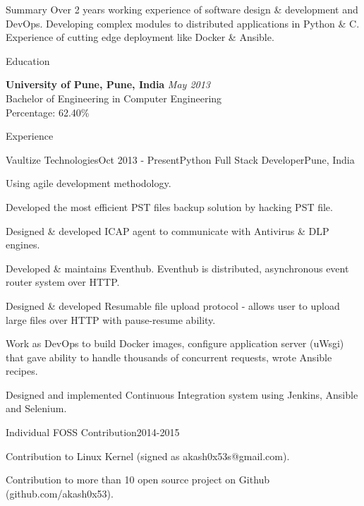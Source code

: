 \documentclass{resume} %
\begin{document}
\begin{rSection}{Summary}
Over 2 years working experience of software design \& development and DevOps. Developing complex modules to distributed applications in Python \& C. Experience of cutting edge deployment like Docker \& Ansible. 
\end{rSection}

\begin{rSection}{Education}

{\bf University of Pune, Pune, India} \hfill {\em May 2013} \\ 
Bachelor of Engineering in Computer Engineering \\
Percentage: 62.40\%

\end{rSection}


\begin{rSection}{Experience}

\begin{rSubsection}{Vaultize Technologies}{Oct 2013 - Present}{Python Full Stack Developer}{Pune, India}
\item Using agile development methodology.
\item Developed the most efficient PST files backup solution by hacking PST file.
\item Designed \& developed ICAP agent to communicate with Antivirus \& DLP engines.
\item Developed \& maintains Eventhub. Eventhub is distributed, asynchronous event router system over HTTP.
\item Designed \& developed Resumable file upload protocol - allows user to upload large files over HTTP with pause-resume ability.
\item Work as DevOps to build Docker images, configure application server (uWsgi) that gave ability to handle thousands of concurrent requests, wrote Ansible recipes.
\item Designed and implemented Continuous Integration system using Jenkins, Ansible and Selenium.
\end{rSubsection}

\begin{rSubsection}{Individual FOSS Contribution}{2014-2015}{}{}
\item Contribution to Linux Kernel (signed as akash0x53s@gmail.com).
\item Contribution to more than 10 open source project on Github (github.com/akash0x53).
\end{rSubsection}



\end{rSection}
\end{document}
